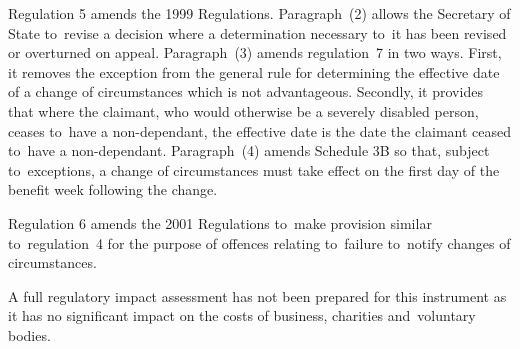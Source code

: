 \documentclass[12pt,a4paper]{article}
\begin{document}
Regulation 5 amends the 1999 Regulations. Paragraph~(2) allows the Secretary of State to~revise a decision where a determination necessary to~it has been revised or overturned on appeal. Paragraph~(3) amends regulation~7 in two ways. First, it removes the exception from the general rule for determining the effective date of a change of circumstances which is not advantageous. Secondly, it provides that where the claimant, who would otherwise be a severely disabled person, ceases to~have a non-dependant, the effective date is the date the claimant ceased to~have a non-dependant. Paragraph~(4) amends Schedule 3B so that, subject to~exceptions, a change of circumstances must take effect on the first day of the benefit week following the change.

Regulation 6 amends the 2001 Regulations to~make provision similar to~regulation~4 for the purpose of offences relating to~failure to~notify changes of circumstances.

A full regulatory impact assessment has not been prepared for this instrument as it has no significant impact on the costs of business, charities and~voluntary bodies. 
\end{document}
